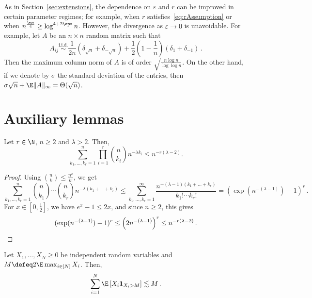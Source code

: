 \documentclass[11pt,a4paper]{article}
\begin{document}
\begin{remark}\label{rem:tightnessSeginer}
    As in Section~\ref{sec:extensions}, the dependence on $\varepsilon$ and $r$ can be improved in certain parameter regimes; for example, when $r$ satisfies~\eqref{eq:rAssumption} or when $n^{\frac \eps 4} \geq \log^{4+2\eps} n$. However, the divergence as $\varepsilon\to 0$ is unavoidable.
    For example, let $A$ be an $n\times n$
    random matrix such that
    \[
        A_{ij}\overset{\text{i.i.d.}}\sim \frac 1{2n} (\delta_{\sqrt n} + \delta_{-\sqrt n}) + \frac 12 \left(1 - \frac 1{n}\right)(\delta_1 + \delta_{-1})\,.
    \]
    Then the maximum column norm
    of $A$ is of order $\sqrt{\frac {n\log n} {\log \log n}}$. On the other hand, if we denote by $\sigma$ the standard deviation of the entries, then $\sigma \sqrt n + \E \|A\|_\infty = \Theta(\sqrt n)$.
\end{remark}

	
    { }

    \appendix
\section{Auxiliary lemmas}\label{sec:truncationinequalities}

\begin{lemma}\label{lemma:subsetunionboundseries}
    Let $r\in \N$, $n \geq 2$ and $\lambda > 2$. Then,
    $$ \sum_{k_1, \ldots, k_r =1}^n \prod_{i=1}^r \binom n {k_i} n^{-\lambda k_i} \leq n^{-r(\lambda -2)}.$$
\end{lemma}

\begin{proof}
    Using $\binom{n}{k} \leq \frac{n^k}{k!}$, we get
    \[
        \sum_{k_1, \ldots, k_r =1}^n \binom{n}{k_1} \cdots \binom{n}{k_r} n^{-\lambda(k_1 + \ldots +k_r)} \leq \sum_{k_1, \ldots, k_r =1}^\infty \frac{ n^{-(\lambda-1)(k_1 + \ldots +k_r)}}{k_1! \cdots k_r!} = (\exp(n^{-(\lambda-1)})-1)^r\,.
    \]
    For $x\in [0,\frac 12]$, we have $e^x-1 \leq 2x$, and since $n \geq 2$, this gives
    \[
        (\exp(n^{-(\lambda-1)})-1)^r \leq \left( {2}n^{-(\lambda -1)}\right)^r \leq n^{-r(\lambda -2)}\,.\qedhere
    \]
\end{proof}

\begin{lemma}\label{lemma:reversetrunc}
    Let $X_1, \ldots, X_N\ge 0$ be independent random variables and $M \defeq 2\E \max_{i\in [N]} X_i$. Then,
    \[
        \sum_{i=1}^N \E \left[X_i \mathbf{1}_{X_i > M}\right] \lesssim M\,.
    \]
\end{lemma}
\end{document}
